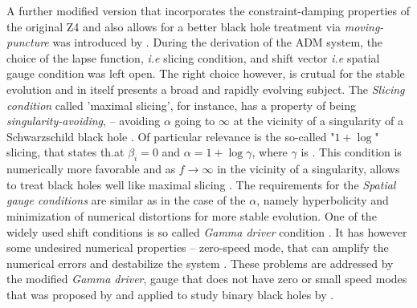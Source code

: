 A further modified version that incorporates the constraint-damping properties of the original Z4 and also allows for a better black hole treatment via \textit{moving-puncture} was introduced by \cite{Alic:2011gg}.
During the derivation of the ADM system, the choice of the lapse function, \textit{i.e} slicing condition, and shift vector \textit{i.e} spatial gauge condition was left open. The right choice however, is crutual for the stable evolution and in itself presents a broad and rapidly evolving subject.
The \textit{Slicing condition} called 'maximal slicing', for instance, has a property of being \textit{singularity-avoiding}, -- avoiding $\alpha$ going to $\infty$ at the vicinity of a singularity of a Schwarzschild black hole \cite{Geyer:1995}.
Of particular relevance is the so-called "$1 + \log$" slicing, that states th.at $\beta_i=0$ and $\alpha = 1 + \log\gamma$, where $\gamma$ is . This condition is numerically more favorable and as $f\rightarrow\infty$ in the vicinity of a singularity, allows to treat black holes well like maximal slicing \cite{Baumgarte:2002jm}.
The requirements for the \textit{Spatial gauge conditions} are similar as in the case of the $\alpha$, namely hyperbolicity and minimization of numerical distortions for more stable evolution. 
One of the widely used shift conditions is so called \textit{Gamma driver} condition \cite{Alcubierre:2002kk}. It has however some undesired numerical properties -- zero-speed mode, that can amplify the numerical errors and destabilize the system \cite{vanMeter:2006vi}. These problems are addressed by the modified \textit{Gamma driver}, gauge that does not have zero or small speed modes that was proposed by \cite{vanMeter:2006vi} and applied to study binary black holes by \cite{Campanelli:2005dd}.